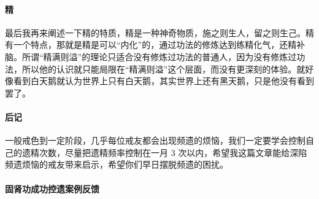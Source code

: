 \documentclass{ctexart}
\begin{document}
\paragraph{精}

最后我再来阐述一下精的特质，精是一种神奇物质，施之则生人，留之则生己。精有一个特点，那就是精是可以“内化”的，通过功法的修炼达到练精化气，还精补脑。所谓“精满则溢”的理论只适合没有修炼过功法的普通人，因为没有修炼过功法，所以他的认识就只能局限在“精满则溢”这个层面，而没有更深刻的体验。就好像看到白天鹅就认为世界上只有白天鹅，其实世界上还有黑天鹅，只是他没有看到罢了。

\paragraph{后记}

一般戒色到一定阶段，几乎每位戒友都会出现频遗的烦恼，我们一定要学会控制自己的遗精次数，尽量把遗精频率控制在一月 3 次以内，希望我这篇文章能给深陷频遗烦恼的戒友带来启示，希望你们早日摆脱频遗的困扰。


\paragraph{固肾功成功控遗案例反馈}
\end{document}
